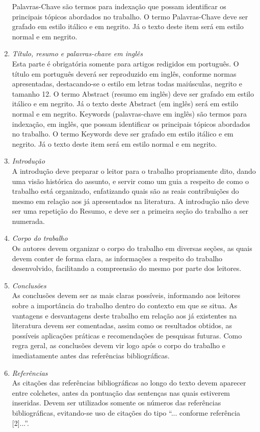 \documentclass{ceel}
\begin{document}
\begin{multicols}{2}
\begin{enumerate}
Palavras-Chave são termos para indexação que possam identificar os principais tópicos abordados no trabalho. O termo Palavras-Chave deve ser grafado em estilo itálico e em negrito. Já o texto deste item será em estilo normal e em negrito.
\item \emph{Título, resumo e palavras-chave em inglês}\\
Esta parte é obrigatória somente para artigos redigidos em português. O título em português deverá ser reproduzido em inglês, conforme normas apresentadas, destacando-se o estilo em letras todas maiúsculas, negrito e tamanho 12. 
O termo Abstract (resumo em inglês) deve ser grafado em estilo itálico e em negrito. Já o texto deste Abstract (em inglês) será em estilo normal e em negrito. 
Keywords (palavras-chave em inglês) são termos para indexação, em inglês, que possam identificar os principais tópicos abordados no trabalho. O termo Keywords deve ser grafado em estilo itálico e em negrito. Já o texto deste item será em estilo normal e em negrito.
\item \emph{Introdução}\\
A introdução deve preparar o leitor para o trabalho propriamente dito, dando uma visão histórica do assunto, e servir como um guia a respeito de como o trabalho está organizado, enfatizando quais são as reais contribuições do mesmo em relação aos já apresentados na literatura. A introdução não deve ser uma repetição do Resumo, e deve ser a primeira seção do trabalho a ser numerada.
\item \emph{Corpo do trabalho}\\
Os autores devem organizar o corpo do trabalho em diversas seções, as quais devem conter de forma clara, as informações a respeito do trabalho desenvolvido, facilitando a compreensão do mesmo por parte dos leitores.
\item \emph{Conclusões}\\
As conclusões devem ser as mais claras possíveis, informando aos leitores sobre a importância do trabalho dentro do contexto em que se situa. As vantagens e desvantagens deste trabalho em relação aos já existentes na literatura devem ser comentadas, assim como os resultados obtidos, as possíveis aplicações práticas e recomendações de pesquisas futuras. Como regra geral, as conclusões devem vir logo após o corpo do trabalho e imediatamente antes das referências bibliográficas.
\item \emph{Referências}\\
As citações das referências bibliográficas ao longo do texto devem aparecer entre colchetes, antes da pontuação das sentenças nas quais estiverem inseridas. Devem ser utilizados somente os números das referências bibliográficas, evitando-se uso de citações do tipo “... conforme referência [2]...”.

\end{enumerate}
\end{multicols}
\end{document}
